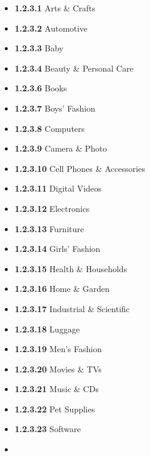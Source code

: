 \documentclass[]{article}
\providecommand{\tightlist}{%
  \setlength{\itemsep}{0pt}\setlength{\parskip}{0pt}}
\begin{document}
\begin{itemize}
          \begin{itemize}
              \tightlist
              \item
                    \textbf{1.2.3.1} Arts \& Crafts
              \item
                    \textbf{1.2.3.2} Automotive
              \item
                    \textbf{1.2.3.3} Baby
              \item
                    \textbf{1.2.3.4} Beauty \& Personal Care
              \item
                    \textbf{1.2.3.6} Books
              \item
                    \textbf{1.2.3.7} Boys' Fashion
              \item
                    \textbf{1.2.3.8} Computers
              \item
                    \textbf{1.2.3.9} Camera \& Photo
              \item
                    \textbf{1.2.3.10} Cell Phones \& Accessories
              \item
                    \textbf{1.2.3.11} Digital Videos
              \item
                    \textbf{1.2.3.12} Electronics
              \item
                    \textbf{1.2.3.13} Furniture
              \item
                    \textbf{1.2.3.14} Girls' Fashion
              \item
                    \textbf{1.2.3.15} Health \& Households
              \item
                    \textbf{1.2.3.16} Home \& Garden
              \item
                    \textbf{1.2.3.17} Industrial \& Scientific
              \item
                    \textbf{1.2.3.18} Luggage
              \item
                    \textbf{1.2.3.19} Men's Fashion
              \item
                    \textbf{1.2.3.20} Movies \& TVs
              \item
                    \textbf{1.2.3.21} Music \& CDs
              \item
                    \textbf{1.2.3.22} Pet Supplies
              \item
                    \textbf{1.2.3.23} Software
              \item

\end{itemize}
\end{itemize}
\end{document}
